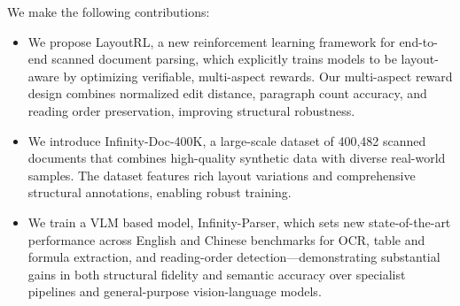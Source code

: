We make the following contributions:

\begin{itemize}[left=0pt]

    \item We propose LayoutRL, a new reinforcement learning framework for end-to-end scanned document parsing, which explicitly trains models to be layout-aware by optimizing verifiable, multi-aspect rewards. Our multi-aspect reward design combines normalized edit distance, paragraph count accuracy, and reading order preservation, improving structural robustness.
  
    \item We introduce Infinity-Doc-400K, a large-scale dataset of 400,482 scanned documents that combines high-quality synthetic data with diverse real-world samples. The dataset features rich layout variations and comprehensive structural annotations, enabling robust training.
    
    \item We train a VLM based model, Infinity-Parser, which sets new state-of-the-art performance across English and Chinese benchmarks for OCR, table and formula extraction, and reading-order detection—demonstrating substantial gains in both structural fidelity and semantic accuracy over specialist pipelines and general-purpose vision-language models. 
\end{itemize}
















